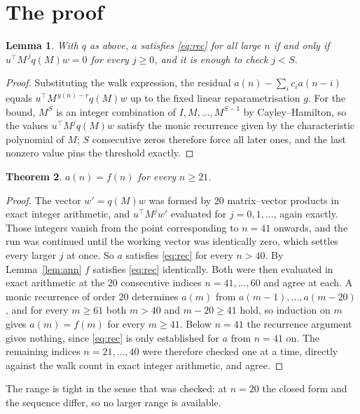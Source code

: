 \documentclass[11pt,a4paper]{article}
\theoremstyle{plain}
\newtheorem{theorem}{Theorem}
\newtheorem{lemma}[theorem]{Lemma}
\theoremstyle{definition}
\begin{document}
\section{The proof}

\begin{lemma}\label{lem:crit}
With $q$ as above, $a$ satisfies \eqref{eq:rec} for all large $n$ if and only if
$u^{\!\top}M^{\,j}q(M)w=0$ for every $j\ge0$, and it is enough to check $j<S$.
\end{lemma}

\begin{proof}
Substituting the walk expression, the residual $a(n)-\sum_ic_ia(n-i)$ equals
$u^{\!\top}M^{\,g(n)-r}q(M)w$ up to the fixed linear reparametrisation $g$. For the bound,
$M^{S}$ is an integer combination of $I,M,\dots,M^{S-1}$ by Cayley--Hamilton, so the values
$u^{\!\top}M^{j}q(M)w$ satisfy the monic recurrence given by the characteristic polynomial of
$M$; $S$ consecutive zeros therefore force all later ones, and the last nonzero value pins the
threshold exactly.
\end{proof}

\begin{theorem}
$a(n)=f(n)$ for every $n\ge21$.
\end{theorem}

\begin{proof}
The vector $w'=q(M)w$ was formed by $20$ matrix--vector products in exact integer
arithmetic, and $u^{\!\top}M^{j}w'$ evaluated for $j=0,1,\dots$, again exactly. Those integers
vanish from the point corresponding to $n=41$ onwards, and the run was continued until the
working vector was identically zero, which settles every larger $j$ at once. So $a$ satisfies
\eqref{eq:rec} for every $n>40$. By Lemma~\ref{lem:ann} $f$ satisfies \eqref{eq:rec}
identically. Both were then evaluated in exact arithmetic at the $20$ consecutive indices
$n=41,\dots,60$ and agree at each. A monic recurrence of order $20$
determines $a(m)$ from $a(m-1),\dots,a(m-20)$, and for every $m\ge61$ both
$m>40$ and $m-20\ge41$ hold, so induction on $m$ gives $a(m)=f(m)$ for every
$m\ge41$.
Below $n=41$ the recurrence argument gives nothing, since \eqref{eq:rec} is only
established for $a$ from $n=41$ on. The remaining indices $n=21,\dots,40$ were
therefore checked one at a time, directly against the walk count in exact integer arithmetic,
and agree.
\end{proof}

The range is tight in the sense that was checked: at $n=20$ the closed form and the sequence differ, so no larger range is available.
\end{document}
